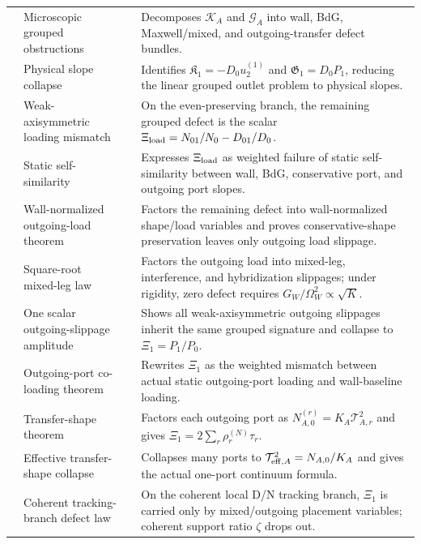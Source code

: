\begin{longtable}{@{}L{0.075\textwidth}L{0.34\textwidth}L{0.20\textwidth}L{0.33\textwidth}@{}}
 & Microscopic grouped obstructions & \StatusExactClosure{} & Decomposes \(\mathcal K_A\) and \(\mathcal G_A\) into wall, BdG, Maxwell/mixed, and outgoing-transfer defect bundles. \\
 & Physical slope collapse & \StatusExactClosure{} & Identifies \(\mathfrak K_1=-D_0u_2^{(1)}\) and \(\mathfrak G_1=D_0P_1\), reducing the linear grouped outlet problem to physical slopes. \\
 & Weak-axisymmetric loading mismatch & \StatusExactClosure{} & On the even-preserving branch, the remaining grouped defect is the scalar \(\Xi_{\rm load}=N_{01}/N_0-D_{01}/D_0\). \\
 & Static self-similarity & \StatusExactClosure{} & Expresses \(\Xi_{\rm load}\) as weighted failure of static self-similarity between wall, BdG, conservative port, and outgoing port slopes. \\
 & Wall-normalized outgoing-load theorem & \StatusExactClosure{} & Factors the remaining defect into wall-normalized shape/load variables and proves conservative-shape preservation leaves only outgoing load slippage. \\
 & Square-root mixed-leg law & \StatusExactClosure{} & Factors the outgoing load into mixed-leg, interference, and hybridization slippages; under rigidity, zero defect requires \(G_W/\Omega_W^2\propto\sqrt K\). \\
 & One scalar outgoing-slippage amplitude & \StatusExactClosure{} & Shows all weak-axisymmetric outgoing slippages inherit the same grouped signature and collapse to \(\Xi_1=P_1/P_0\). \\
 & Outgoing-port co-loading theorem & \StatusExactClosure{} & Rewrites \(\Xi_1\) as the weighted mismatch between actual static outgoing-port loading and wall-baseline loading. \\
 & Transfer-shape theorem & \StatusExactClosure{} & Factors each outgoing port as \(N_{A,0}^{(r)}=K_A\mathcal T_{A,r}^2\) and gives \(\Xi_1=2\sum_r\rho_r^{(N)}\tau_r\). \\
 & Effective transfer-shape collapse & \StatusExactClosure{} & Collapses many ports to \(\mathcal T_{{\rm eff},A}^2=N_{A,0}/K_A\) and gives the actual one-port continuum formula. \\
 & Coherent tracking-branch defect law & \StatusExactClosure{} & On the coherent local D/N tracking branch, \(\Xi_1\) is carried only by mixed/outgoing placement variables; coherent support ratio \(\zeta\) drops out. \\

\end{longtable}
